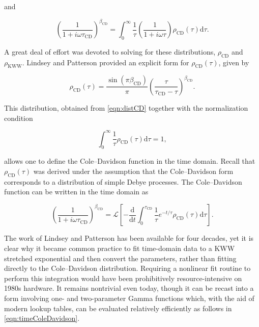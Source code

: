 \noindent and

\begin{equation}\left( \frac{1}{1+i\omega\tau_{\mathrm{CD}}} \right)^{\beta_{\mathrm{CD}}}= \int_{0}^{\infty} \frac{1}{\tau}\left( \frac{1}{1+i\omega\tau} \right)\rho_{\mathrm{CD}}(\tau)\mathrm{d}\tau.
	\label{eqn:distCD}
\end{equation}

A great deal of effort was devoted to solving for these distributions, $\rho_{\mathrm{CD}}$ and $\rho_{\mathrm{KWW}}$. Lindsey and Patterson provided an explicit form for $\rho_{\mathrm{CD}}(\tau)$, given by

\begin{equation}\label{eqn}\rho_{\mathrm{CD}}(\tau) =\frac{\sin(\pi \beta_{\mathrm{CD}})}{\pi}\left( \frac{\tau}{\tau_{\mathrm{CD}} - \tau} \right)^{\beta_{\mathrm{CD}}}.\end{equation}

\noindent This distribution, obtained from \eqn \ref{eqn:distCD} together with the normalization condition

\begin{equation}\int_{0}^{\infty} \frac{1}{\tau}\rho_{\mathrm{CD}}(\tau)\mathrm{d}\tau = 1,
\end{equation}

\noindent allows one to define the Cole–Davidson function in the time domain. Recall that $\rho_{\mathrm{CD}}(\tau)$ was derived under the assumption that the Cole–Davidson form corresponds to a distribution of simple Debye processes.  The Cole–Davidson function can be written in the time domain as

\begin{equation}
	\left( \frac{1}{1 + i \omega \tau_{\mathrm{CD}}} \right)^{\beta_{\mathrm{CD}}}= \mathscr{L}\left[ -\frac{\mathrm{d}}{\mathrm{d}t}\int_{0}^{\tau_{\mathrm{CD}}} \frac{1}{\tau}e^{-t/\tau}\rho_{\mathrm{CD}}(\tau)\mathrm{d}\tau \right].
\end{equation}

The work of Lindsey and Patterson has been available for four decades, yet it is clear why it became common practice to fit time-domain data to a KWW stretched exponential and then convert the parameters, rather than fitting directly to the Cole–Davidson distribution. Requiring a nonlinear fit routine to perform this integration would have been prohibitively resource-intensive on 1980s hardware. It remains nontrivial even today, though it can be recast into a form involving one- and two-parameter Gamma functions which, with the aid of modern lookup tables, can be evaluated relatively efficiently as follows in \eqn \ref{eqn:timeColeDavidson}.

